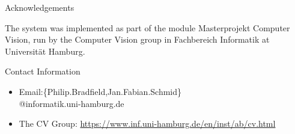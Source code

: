 \documentclass[final,20pt]{beamer}
\newlength{\sepwid}
\newlength{\onecolwid}
\newlength{\twocolwid}
\begin{document}
\begin{frame}[t]
\begin{columns}[t]
\begin{column}{\twocolwid}
\begin{columns}[t, totalwidth=\twocolwid]
\begin{column}{\onecolwid}
	
			\begin{block}{Acknowledgements}
	
			\small{The system was implemented as part of the module Masterprojekt Computer Vision, run by the Computer Vision group in Fachbereich Informatik at Universit\"{a}t Hamburg.}
	
			\end{block}

	
	
			\begin{block}{Contact Information}
	
			\begin{itemize}
				\item Email:\{Philip.Bradfield,Jan.Fabian.Schmid\}\\\hspace{3.5cm}@informatik.uni-hamburg.de
				\item The CV Group: \href{https://www.inf.uni-hamburg.de/en/inst/ab/cv.html}{https://www.inf.uni-hamburg.de/en/inst/ab/cv.html}
			\end{itemize}
	
	
			\end{block}

		\end{column}

		\begin{column}{\sepwid}
		\end{column} %


\end{columns}
\end{column}
\end{columns}
\end{frame}
\end{document}
